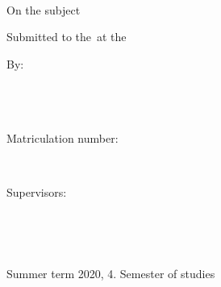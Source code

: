 
\begin{titlepage}
    \begin{center}
       \vspace*{.04\textheight}
       {\scshape\huge\univname\par\vspace{0.8cm}} %
       \textsc{\large \degreename}\\[0.5cm] %
  
       \vfill
  
       On the subject\\
       {\large \bfseries \ttitle\par}\vspace{0.4cm} %
  
      \vfill
      \vfill
  
       {Submitted to the \facname \,at the \univname}\vspace{0.8cm} %
  
       \vfill
       \vfill
       \vfill
       \vfill
       \vfill
  
       \begin{minipage}[t]{0.2\textwidth}
        \begin{flushleft} \large
         By:
        \end{flushleft}
       \end{minipage}
       \begin{minipage}[t]{0.6\textwidth}
        \begin{flushleft} \large
          \authorname\\
          \addressname\\
          \email\\
          Matriculation number: \matnumber
        \end{flushleft}
       \end{minipage}\\[1cm]
  
       \begin{minipage}[t]{0.2\textwidth}
        \begin{flushleft} \large
         Supervisors:
        \end{flushleft}
       \end{minipage}
       \begin{minipage}[t]{0.6\textwidth}
        \begin{flushleft} \large
          \supname\\
          \examname
        \end{flushleft}
       \end{minipage}\\[1cm]
  
       \vfill
  
       Summer term 2020, 4. Semester of studies
       \vfill
    \end{center}
  \end{titlepage}